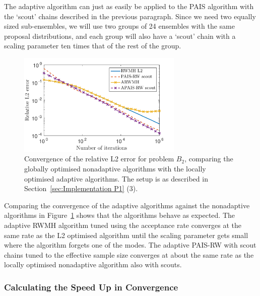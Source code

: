 \documentclass[final]{siamltex}
\begin{document}
The adaptive algorithm can just as easily be applied to the PAIS algorithm with the `scout' chains described in the previous paragraph. Since we need two equally sized sub-ensembles, we will use two groups of 24 ensembles with the same proposal distributions, and each group will also have a `scout' chain with a scaling parameter ten times that of the rest of the group.

\begin{figure}[htb]
\begin{center}
\includegraphics[width=0.7\textwidth]{"figures/BM2_AL2"}
\caption{Convergence of the relative L2 error for problem $B_2$, comparing the globally optimised nonadaptive algorithms with the locally optimised adaptive algorithms. The setup is as described in Section~\ref{sec:Implementation P1} (3).}
\label{fig:BM2_AL2}
\end{center}
\end{figure}

Comparing the convergence of the adaptive algorithms against the nonadaptive algorithms in Figure~\ref{fig:BM2_AL2} shows that the algorithms behave as expected. The adaptive RWMH algorithm tuned using the acceptance rate converges at the same rate as the L2 optimised algorithm until the scaling parameter gets small where the algorithm forgets one of the modes. The adaptive PAIS-RW with scout chains tuned to the effective sample size converges at about the same rate as the locally optimised nonadaptive algorithm also with scouts.

\subsubsection{Calculating the Speed Up in Convergence}\label{sec:calc_saving}
\end{document}
